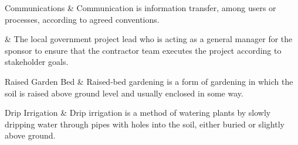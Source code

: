 
Communications		&	\KNEADglossaryEntryStart
{
Communication is information transfer, among users or processes, according to agreed conventions.
}\KNEADglossaryEntryClose

\Customer         & \KNEADglossaryEntryStart
{
The local government project lead who is acting as a general manager for the sponsor to ensure that the contractor team executes the project according to stakeholder goals.
}\KNEADglossaryEntryClose

Raised Garden Bed		&	\KNEADglossaryEntryStart
{
Raised-bed gardening is a form of gardening in which the soil is raised above ground level and usually enclosed in some way.
}\KNEADglossaryEntryClose

Drip Irrigation		&	\KNEADglossaryEntryStart
{
Drip irrigation is a method of watering plants by slowly dripping water through pipes with holes into the soil, either buried or slightly above ground.
}\KNEADglossaryEntryCloseLast


